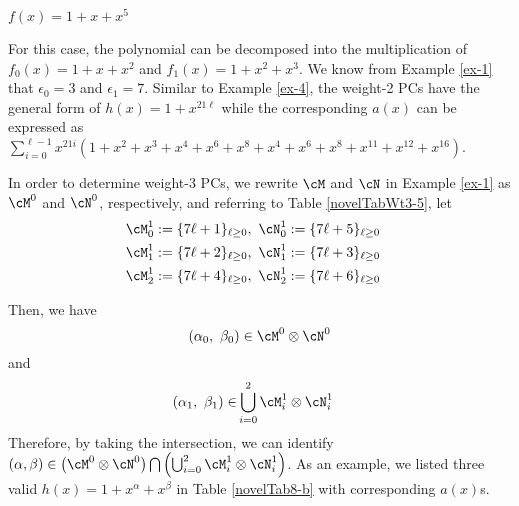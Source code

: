\begin{example}
$f(x)=1+x+x^5$

For this case, the polynomial can be decomposed into the multiplication of $f_0(x)=1+x+x^2$ and $f_1(x)=1+x^2+x^3$.  We know from Example \ref{ex-1} that $\epsilon_0=3$ and $\epsilon_1=7$. Similar to Example \ref{ex-4}, the weight-2 PCs have the general  form of $h(x)=1+x^{21\ell}$ while the corresponding $a(x)$ can be expressed as $\sum_{i=0}^{\ell-1} x^{21i}(1+x^2+x^3+x^4+x^6+x^8+x^{4}+x^{6}+x^{8}+x^{11}+x^{12}+x^{16})$.


In order to determine weight-3 PCs, we rewrite $\cM$ and $\cN$ in Example \ref{ex-1} as $\cM^0$ and $\cN^0$, respectively,
and referring to Table \ref{novelTabWt3-5}, let
\begin{align}
	\cM_0^1 &:= \{7\ell + 1\}_{\ell \geq 0},~\cN_0^1 := \{7\ell + 5\}_{\ell \geq 0}\cr
	\cM_1^1 &:= \{7\ell + 2\}_{\ell \geq 0},~\cN_1^1 := \{7\ell + 3\}_{\ell \geq 0}\cr
	\cM_2^1 &:= \{7\ell + 4\}_{\ell \geq 0},~\cN_2^1 := \{7\ell + 6\}_{\ell \geq 0}
\end{align}



Then, we have
\[
(\alpha_0,~\beta_0) \in \cM^0\otimes\cN^0 
\]
and
\begin{equation*}
\begin{split}
(\alpha_1,~\beta_1) \in &\bigcup_{i=0}^2 \cM_i^1\otimes\cN_i^1 
\end{split}
\end{equation*}
Therefore, by taking the intersection, we can identify $(\alpha,\beta) \in \left(\cM^0\otimes\cN^0\right)\bigcap\left(\bigcup_{i=0}^2 \cM_i^1\otimes\cN_i^1 \right) $. As an example, we listed three valid $h(x)=1+x^\alpha+x^\beta$ in Table \ref{novelTab8-b} with corresponding $a(x)$s.
\label{ex-5}
\end{example}

